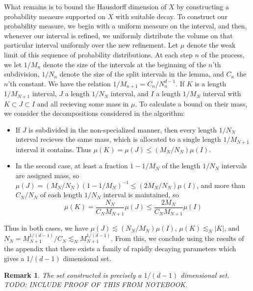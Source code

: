 \documentclass{report}
\theoremstyle{plain}
\theoremstyle{plain}
\newtheorem*{remark}{Remark}
\begin{document}
What remains is to bound the Hausdorff dimension of $X$ by constructing a probability measure supported on $X$ with suitable decay. To construct our probability measure, we begin with a uniform measure on the interval, and then, whenever our interval is refined, we uniformly distribute the volume on that particular interval uniformly over the new refinement. Let $\mu$ denote the weak limit of this sequence of probability distributions. At each step $n$ of the process, we let $1/M_n$ denote the size of the intervals at the beginning of the $n$'th subdivision, $1/N_n$ denote the size of the split intervals in the lemma, and $C_n$ the $n$'th constant. We have the relation $1/M_{n+1} = C_n/N_n^{d-1}$. If $K$ is a length $1/M_{N+1}$ interval, $J$ a length $1/N_N$ interval, and $I$ a length $1/M_N$ interval with $K \subset J \subset I$ and all recieving some mass in $\mu$. To calculate a bound on their mass, we consider the decompositions considered in the algorithm:
%
\begin{itemize}
        \item If $J$ is subdivided in the non-specialized manner, then every length $1/N_N$ interval recieves the same mass, which is allocated to a single length $1/M_{N+1}$ interval it contains. Thus $\mu(K) = \mu(J) \leq (M_N/N_N) \mu(I)$.
        \item In the second case, at least a fraction $1 - 1/M_N$ of the length $1/N_N$ intervals are assigned mass, so $\mu(J) = (M_N/N_N)(1 - 1/M_N)^{-1} \leq (2M_N/N_N) \mu(I)$, and more than $C_N/N_N$ of each length $1/N_N$ interval is maintained, so
        \[ \mu(K) = \frac{N_N}{C_NM_{N+1}} \mu(J) \leq \frac{2M_N}{C_NM_{N+1}} \mu(I) \]
\end{itemize}
%
Thus in both cases, we have $\mu(J) \lesssim (N_N/M_N) \mu(I)$, $\mu(K) \lesssim_N |K|$, and $N_N = M_{N+1}^{1/(d-1)}/C_N \lesssim_N M_{N+1}^{1/(d-1)}$. From this, we conclude using the results of the appendix that there exists a family of rapidly decaying parameters which gives a $1/(d-1)$ dimensional set.

\begin{remark}
    The set constructed is precisely a $1/(d-1)$ dimensional set. TODO: INCLUDE PROOF OF THIS FROM NOTEBOOK.
\end{remark}

\end{document}
